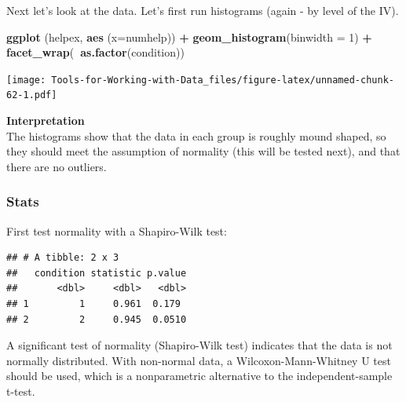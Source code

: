 \documentclass[
]{book}
\newenvironment{Shaded}{\begin{snugshade}}{\end{snugshade}}
\newcommand{\DataTypeTok}[1]{\textcolor[rgb]{0.13,0.29,0.53}{#1}}
\newcommand{\DecValTok}[1]{\textcolor[rgb]{0.00,0.00,0.81}{#1}}
\newcommand{\KeywordTok}[1]{\textcolor[rgb]{0.13,0.29,0.53}{\textbf{#1}}}
\newcommand{\NormalTok}[1]{#1}
\newcommand{\OperatorTok}[1]{\textcolor[rgb]{0.81,0.36,0.00}{\textbf{#1}}}
\newcommand{\StringTok}[1]{\textcolor[rgb]{0.31,0.60,0.02}{#1}}
\begin{document}
Next let's look at the data. Let's first run histograms (again - by level of the IV).

\begin{Shaded}
\begin{Highlighting}[]
\KeywordTok{ggplot}\NormalTok{ (helpex, }\KeywordTok{aes}\NormalTok{ (}\DataTypeTok{x=}\NormalTok{numhelp)) }\OperatorTok{+}
\StringTok{  }\KeywordTok{geom_histogram}\NormalTok{(}\DataTypeTok{binwidth =} \DecValTok{1}\NormalTok{) }\OperatorTok{+}
\StringTok{  }\KeywordTok{facet_wrap}\NormalTok{(}\OperatorTok{~}\KeywordTok{as.factor}\NormalTok{(condition))}
\end{Highlighting}
\end{Shaded}

\texttt{[image: Tools-for-Working-with-Data\_files/figure-latex/unnamed-chunk-62-1.pdf]}

\textbf{Interpretation}\\
The histograms show that the data in each group is roughly mound shaped, so they should meet the assumption of normality (this will be tested next), and that there are no outliers.

\hypertarget{stats}{%
\subsubsection{Stats}\label{stats}}

First test normality with a Shapiro-Wilk test:

\begin{Shaded}
\end{Shaded}

\begin{verbatim}
## # A tibble: 2 x 3
##   condition statistic p.value
##       <dbl>     <dbl>   <dbl>
## 1         1     0.961  0.179 
## 2         2     0.945  0.0510
\end{verbatim}

A significant test of normality (Shapiro-Wilk test) indicates that the data is not normally distributed. With non-normal data, a Wilcoxon-Mann-Whitney U test should be used, which is a nonparametric alternative to the independent-sample t-test.
\end{document}
